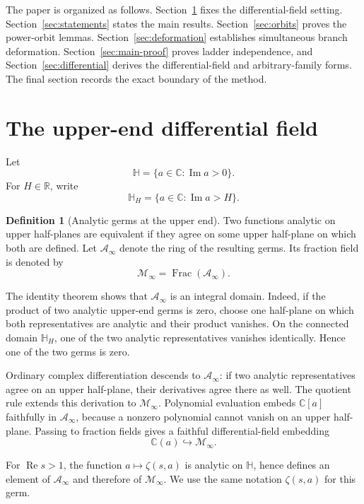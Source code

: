 \documentclass[11pt,reqno]{amsart}
\theoremstyle{definition}
\newtheorem{definition}[theorem]{Definition}
\theoremstyle{remark}
\newcommand{\C}{\mathbb C}
\newcommand{\HH}{\mathbb H}
\newcommand{\Ainf}{\mathcal A_{\infty}}
\newcommand{\Minf}{\mathcal M_{\infty}}
\DeclareMathOperator{\Frac}{Frac}
\begin{document}
The paper is organized as follows.  Section~\ref{sec:field} fixes the
differential-field setting.  Section~\ref{sec:statements} states the main
results.  Section~\ref{sec:orbits} proves the power-orbit lemmas.
Section~\ref{sec:deformation} establishes simultaneous branch deformation.
Section~\ref{sec:main-proof} proves ladder independence, and
Section~\ref{sec:differential} derives the differential-field and
arbitrary-family forms.  The final section records the exact boundary of the
method.

\section{The upper-end differential field}\label{sec:field}

Let
\[
  \HH=\{a\in\C:\operatorname{Im}a>0\}.
\]
For $H\in\mathbb R$, write
\[
  \HH_H=\{a\in\C:\operatorname{Im}a>H\}.
\]

\begin{definition}[Analytic germs at the upper end]
Two functions analytic on upper half-planes are equivalent if they agree on
some upper half-plane on which both are defined.  Let $\Ainf$ denote the ring
of the resulting germs.  Its fraction field is denoted by
\[
  \Minf=\Frac(\Ainf).
\]
\end{definition}

The identity theorem shows that $\Ainf$ is an integral domain.  Indeed, if
the product of two analytic upper-end germs is zero, choose one half-plane on
which both representatives are analytic and their product vanishes.  On the
connected domain $\HH_H$, one of the two analytic representatives vanishes
identically.  Hence one of the two germs is zero.

Ordinary complex differentiation descends to $\Ainf$: if two analytic
representatives agree on an upper half-plane, their derivatives agree there
as well.  The quotient rule extends this derivation to $\Minf$.  Polynomial
evaluation embeds $\C[a]$ faithfully in $\Ainf$, because a nonzero polynomial
cannot vanish on an upper half-plane.  Passing to fraction fields gives a
faithful differential-field embedding
\begin{equation}\label{eq:ratfunc-embedding}
  \C(a)\hookrightarrow\Minf.
\end{equation}

For $\operatorname{Re}s>1$, the function $a\mapsto\zeta(s,a)$ is analytic on
$\HH$, hence defines an element of $\Ainf$ and therefore of $\Minf$.  We use
the same notation $\zeta(s,a)$ for this germ.
\end{document}

